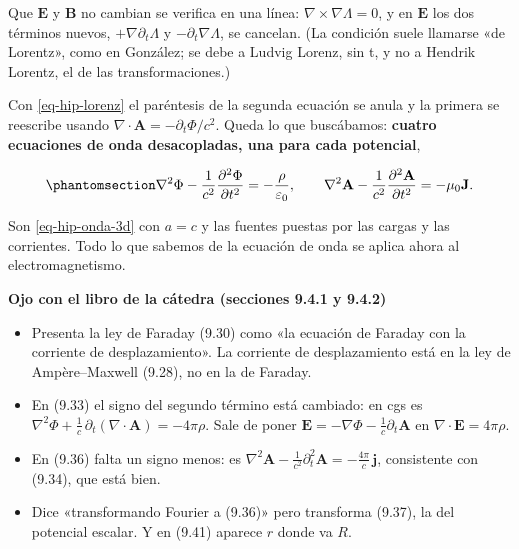 \documentclass[
  spanish,
  a4paper,
]{scrbook}
\providecommand{\tightlist}{%
  \setlength{\itemsep}{0pt}\setlength{\parskip}{0pt}}
\theoremstyle{definition}
\theoremstyle{plain}
\theoremstyle{definition}
\theoremstyle{plain}
\theoremstyle{definition}
\theoremstyle{remark}
\begin{document}
Que \(\mathbf E\) y \(\mathbf B\) no cambian se verifica en una línea:
\(\nabla\times\nabla\Lambda = 0\), y en \(\mathbf E\) los dos términos
nuevos, \(+\nabla\partial_t\Lambda\) y \(-\partial_t\nabla\Lambda\), se
cancelan. (La condición suele llamarse «de Lorentz», como en González;
se debe a Ludvig Lorenz, sin t, y no a Hendrik Lorentz, el de las
transformaciones.)

Con \ref{eq-hip-lorenz} el paréntesis de la segunda ecuación se anula y
la primera se reescribe usando
\(\nabla\cdot\mathbf A = -\partial_t\Phi/c^2\). Queda lo que buscábamos:
\textbf{cuatro ecuaciones de onda desacopladas, una para cada
potencial},

\begin{equation}\protect\phantomsection\label{eq-hip-potenciales-onda}{
\nabla^2\Phi - \frac{1}{c^2}\frac{\partial^2\Phi}{\partial t^2} = -\frac{\rho}{\varepsilon_0},
\qquad
\nabla^2\mathbf A - \frac{1}{c^2}\frac{\partial^2\mathbf A}{\partial t^2} = -\mu_0\mathbf J .
}\end{equation}

Son \ref{eq-hip-onda-3d} con \(a = c\) y las fuentes puestas por las
cargas y las corrientes. Todo lo que sabemos de la ecuación de onda se
aplica ahora al electromagnetismo.

\begin{tcolorbox}[enhanced jigsaw, arc=.35mm, bottomrule=.15mm, breakable, colback=white, colframe=quarto-callout-warning-color-frame, left=2mm, leftrule=.75mm, opacityback=0, rightrule=.15mm, toprule=.15mm]
\begin{minipage}[t]{5.5mm}
\textcolor{quarto-callout-warning-color}{\faExclamationTriangle}
\end{minipage}%
\begin{minipage}[t]{\textwidth - 5.5mm}

\vspace{-3mm}\textbf{Ojo con el libro de la cátedra (secciones 9.4.1 y 9.4.2)}\vspace{3mm}

\begin{itemize}
\tightlist
\item
  Presenta la ley de Faraday (9.30) como «la ecuación de Faraday con la
  corriente de desplazamiento». La corriente de desplazamiento está en
  la ley de Ampère--Maxwell (9.28), no en la de Faraday.
\item
  En (9.33) el signo del segundo término está cambiado: en cgs es
  \(\nabla^2\Phi + \tfrac1c\,\partial_t(\nabla\cdot\mathbf A) = -4\pi\rho\).
  Sale de poner
  \(\mathbf E = -\nabla\Phi - \tfrac1c\partial_t\mathbf A\) en
  \(\nabla\cdot\mathbf E = 4\pi\rho\).
\item
  En (9.36) falta un signo menos: es
  \(\nabla^2\mathbf A - \tfrac1{c^2}\partial_t^2\mathbf A = -\tfrac{4\pi}{c}\,\mathbf j\),
  consistente con (9.34), que está bien.
\item
  Dice «transformando Fourier a (9.36)» pero transforma (9.37), la del
  potencial escalar. Y en (9.41) aparece \(r\) donde va \(R\).
\end{itemize}

\end{minipage}%
\end{tcolorbox}
\end{document}
